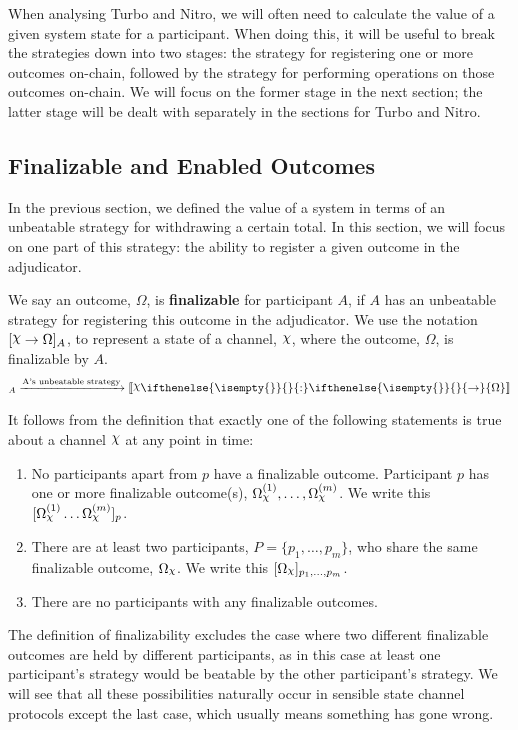 \documentclass{article}
\DeclareRobustCommand{\rchi}{{\mathpalette\irchi\relax}}
\newcommand{\irchi}[2]{\raisebox{\depth}{$#1\chi$}} %
\theoremstyle{definition}
\newcommand{\adj}[1]{\llbracket #1 \rrbracket}
\newcommand{\enf}[1]{[#1]}
\newcommand{\holds}[3]{#1 %
  \ifthenelse{\isempty{#2}}{}{: #2} %
  \ifthenelse{\isempty{#3}}{}{\rightarrow #3} %
}
\newcommand{\finalizable}[3]{[#1 \rightarrow #2]_{#3}}
\begin{document}
When analysing Turbo and Nitro, we will often need to calculate the value of a given system
state for a participant.
When doing this, it will be useful to break the strategies down into two stages: the strategy
for registering one or more outcomes on-chain, followed by the strategy for performing operations
on those outcomes on-chain.
We will focus on the former stage in the next section; the latter stage will be dealt with
separately in the sections for Turbo and Nitro.

\subsection{Finalizable and Enabled Outcomes}

In the previous section, we defined the value of a system in terms of an unbeatable strategy
for withdrawing a certain total.
In this section, we will focus on one part of this strategy: the ability to register a given
outcome in the adjudicator.

We say an outcome, $\Omega$, is \textbf{finalizable} for participant $A$, if $A$ has an unbeatable
strategy for registering this outcome in the adjudicator.
We use the notation $\finalizable{\rchi}{\Omega}{A}$, to represent a state of a channel, $\rchi$,
where the outcome, $\Omega$, is finalizable by $A$.
\begin{align*}
  \finalizable{\rchi}{\Omega}{A} \xrightarrow{\text{A's unbeatable strategy}} \adj{\holds{\rchi}{}{}{\Omega}}
\end{align*}

It follows from the definition that exactly one of the following statements is true about
a channel $\rchi$ at any point in time:
\begin{enumerate}
  \item No participants apart from $p$ have a finalizable outcome.
        Participant $p$ has one or more finalizable outcome(s), $\Omega_\rchi^{(1)}, \dots, \Omega_\rchi^{(m)}$.
        We write this $\enf{\Omega_\rchi^{(1)} \dots \Omega_\rchi^{(m)}}_p$.
  \item There are at least two participants, $P = \{p_1, \dots, p_m \}$, who share the same
        finalizable outcome, $\Omega_\rchi$. We write this $\enf{\Omega_\rchi}_{p_1, \dots, p_m}$.
  \item There are no participants with any finalizable outcomes.
\end{enumerate}
The definition of finalizability excludes the case where two different finalizable outcomes are held
by different participants, as in this case at least one participant's strategy would be beatable
by the other participant's strategy.
We will see that all these possibilities naturally occur in sensible state channel protocols
except the last case, which usually means something has gone wrong.
\end{document}
